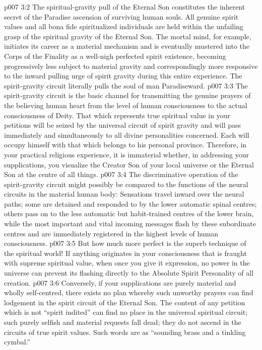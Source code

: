 \vs p007 3:2 The spiritual\hyp{}gravity pull of the Eternal Son constitutes the inherent secret of the Paradise ascension of surviving human souls. All genuine spirit values and all bona fide spiritualized individuals are held within the unfailing grasp of the spiritual gravity of the Eternal Son. The mortal mind, for example, initiates its career as a material mechanism and is eventually mustered into the Corps of the Finality as a well\hyp{}nigh perfected spirit existence, becoming progressively less subject to material gravity and correspondingly more responsive to the inward pulling urge of spirit gravity during this entire experience. The spirit\hyp{}gravity circuit literally pulls the soul of man Paradiseward.
\vs p007 3:3 \pc The spirit\hyp{}gravity circuit is the basic channel for transmitting the genuine prayers of the believing human heart from the level of human consciousness to the actual consciousness of Deity. That which represents true spiritual value in your petitions will be seized by the universal circuit of spirit gravity and will pass immediately and simultaneously to all divine personalities concerned. Each will occupy himself with that which belongs to his personal province. Therefore, in your practical religious experience, it is immaterial whether, in addressing your supplications, you visualize the Creator Son of your local universe or the Eternal Son at the centre of all things.
\vs p007 3:4 \pc The discriminative operation of the spirit\hyp{}gravity circuit might possibly be compared to the functions of the neural circuits in the material human body: Sensations travel inward over the neural paths; some are detained and responded to by the lower automatic spinal centres; others pass on to the less automatic but habit\hyp{}trained centres of the lower brain, while the most important and vital incoming messages flash by these subordinate centres and are immediately registered in the highest levels of human consciousness.
\vs p007 3:5 But how much more perfect is the superb technique of the spiritual world! If anything originates in your consciousness that is fraught with supreme spiritual value, when once you give it expression, no power in the universe can prevent its flashing directly to the Absolute Spirit Personality of all creation.
\vs p007 3:6 Conversely, if your supplications are purely material and wholly self\hyp{}centred, there exists no plan whereby such unworthy prayers can find lodgement in the spirit circuit of the Eternal Son. The content of any petition which is not “spirit indited” can find no place in the universal spiritual circuit; such purely selfish and material requests fall dead; they do not ascend in the circuits of true spirit values. Such words are as “sounding brass and a tinkling cymbal.”
